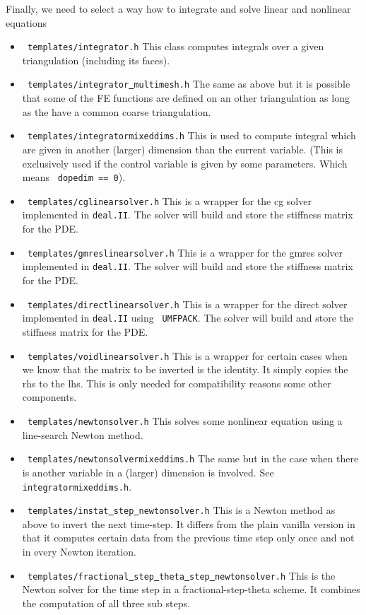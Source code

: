 Finally, we need to select a way how to integrate and solve linear and nonlinear equations
\begin{itemize}
\item \texttt{ templates/integrator.h} This class computes integrals over a given 
  triangulation (including its faces).
\item \texttt{ templates/integrator\underline{ }multimesh.h} The same as above but it is 
  possible that some of the FE functions are defined on an other triangulation 
  as long as the have a common coarse triangulation.
\item \texttt{ templates/integratormixeddims.h} This is used to compute integral which 
  are given in another (larger) dimension than the current variable. (This is exclusively
  used if the control variable is given by some parameters. Which means \texttt{ dopedim == 0}). 
\item \texttt{ templates/cglinearsolver.h} This is a wrapper for the cg solver implemented in 
  \texttt{deal.II}. The solver will build and store the stiffness matrix for the PDE.
\item \texttt{ templates/gmreslinearsolver.h} This is a wrapper for the gmres solver 
  implemented in \texttt{deal.II}. The solver will build and store the stiffness matrix 
  for the PDE.
\item \texttt{ templates/directlinearsolver.h} This is a wrapper for the direct solver 
  implemented in \texttt{deal.II} using \texttt{ UMFPACK}. 
  The solver will build and store the stiffness matrix for the PDE.
\item \texttt{ templates/voidlinearsolver.h} This is a wrapper for certain cases when we 
  know that the matrix to be inverted is the identity. It simply copies the rhs to the
  lhs. This is only needed for compatibility reasons some other components.
\item \texttt{ templates/newtonsolver.h} This solves some nonlinear equation using a 
  line-search Newton method.
\item \texttt{ templates/newtonsolvermixeddims.h} The same but in the case when there is 
  another variable in a (larger) dimension is involved. See 
  \texttt{ integratormixeddims.h}.
\item \texttt{ templates/instat\underline{ }step\underline{ }newtonsolver.h} This is a 
  Newton method as above to invert the next time-step. It differs from the plain vanilla
  version in that it computes certain data from the previous time step only once 
  and not in every Newton iteration.
\item \texttt{ templates/fractional\underline{ }step\underline{ }theta\underline{ }step\underline{ }newtonsolver.h} This is the Newton solver for the time step in a 
  fractional-step-theta scheme. It combines the computation of all three sub steps.
\end{itemize}

